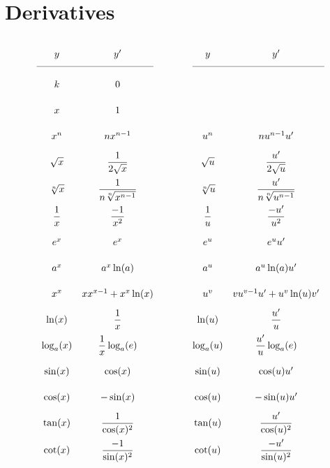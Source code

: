 \section*{Derivatives}
\small
{}

\centering
\begin{tcolorbox}[hbox, title=Basic derivatives]
\begin{minipage}{0.7\textwidth}
\[
  \def\arraystretch{2.2}
  \begin{array}{ccccc}
  y            & y'                            & \qquad & y            & y'\\
  \cmidrule(r){1-2}\cmidrule(l){4-5}
  k            & 0\\
  x            & 1\\ 
  x^n          & nx^{n-1}                      & \qquad & u^n          & nu^{n-1}u'\\
  \sqrt{x}     & \dfrac{1}{2\sqrt{x}}          & \qquad & \sqrt{u}     & \dfrac{u'}{2\sqrt{u}}\\
  \sqrt[n]{x}  & \dfrac{1}{n\sqrt[n]{x^{n-1}}} & \qquad & \sqrt[n]{u}  & \dfrac{u'}{n\sqrt[n]{u^{n-1}}}\\
  \dfrac{1}{x} & \dfrac{-1}{x^2}               & \qquad & \dfrac{1}{u} & \dfrac{-u'}{u^2}\\  
  e^x          & e^x                           & \qquad & e^u          & e^u u'\\
  a^x          & a^x\ln(a)                     & \qquad & a^u          & a^u\ln(a)u'\\
  x^x          & xx^{x-1}+x^x\ln(x)            & \qquad & u^v          & vu^{v-1}u'+u^v\ln(u) v'\\
  \ln(x)       & \dfrac{1}{x}                  & \qquad & \ln(u)        & \dfrac{u'}{u}\\
  \log_a(x)    & \dfrac{1}{x}\log_a(e)         & \qquad & \log_a(u)    & \dfrac{u'}{u}\log_a(e)\\
  \sin(x)      & \cos(x)                       & \qquad & \sin(u)       & \cos(u)u'\\
  \cos(x)      & -\sin(x)                      & \qquad & \cos(u)      & -\sin(u)u'\\
  \tan(x)      & \dfrac{1}{\cos(x)^2}          & \qquad & \tan(u)      & \dfrac{u'}{\cos(u)^2}\\
  \cot(x)      & \dfrac{-1}{\sin(x)^2}         & \qquad & \cot(u)      & \dfrac{-u'}{\sin(u)^2}\\

\end{array}\]
\end{minipage}
\end{tcolorbox}
